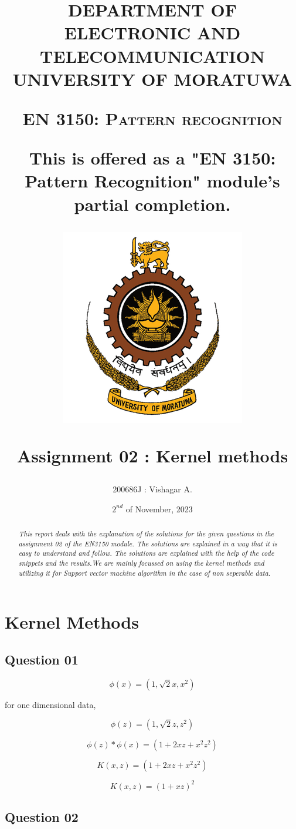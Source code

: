 \documentclass[11pt,a4paper]{article}
\title{DEPARTMENT OF ELECTRONIC AND TELECOMMUNICATION
UNIVERSITY OF MORATUWA

\vspace{10pt}

{\large{\textsc{EN 3150: Pattern recognition}}}

{\textsf{This is offered as a "EN 3150: Pattern Recognition" module's partial completion.}}

\vspace{30pt}
\includegraphics[scale=1.20]{images/University_of_Moratuwa_logo.png}

{\textsf{\textbf{Assignment 02 : Kernel methods}}}}
\author{200686J : Vishagar A.}
\date{$2^{nd}$ of November, 2023}
\begin{document}
\maketitle

\newpage

\begin{abstract}
    \textit{This report deals with the explanation of the solutions for the given questions in the assignment 02 of the EN3150 module. The solutions are explained in a way that it is easy to understand and follow. The solutions are explained with the help of the code snippets and the results.We are mainly focussed on using the kernel methods and utilizing it for Support vector machine algorithm in the case of non seperable data.}    
\end{abstract}    

\vspace{50pt}
\tableofcontents


\newpage

\twocolumn

\section{Kernel Methods}
\subsection{Question 01}

\begin{equation}
    \phi{(x)} =  (1,\sqrt{2}x,x^2)
\end{equation}

for one dimensional data,

\begin{equation}
    \phi{(z)} =  (1,\sqrt{2}z,z^2)
\end{equation}

\begin{equation}
    \phi{(z)}*\phi{(x)} =  (1 + 2xz + x^2z^2)
\end{equation}

\begin{equation}
    K(x,z) =  (1 + 2xz + x^2z^2)
\end{equation}

\begin{equation}
    K(x,z) =  (1 + xz)^2   
\end{equation}

\subsection{Question 02}
\end{document}
